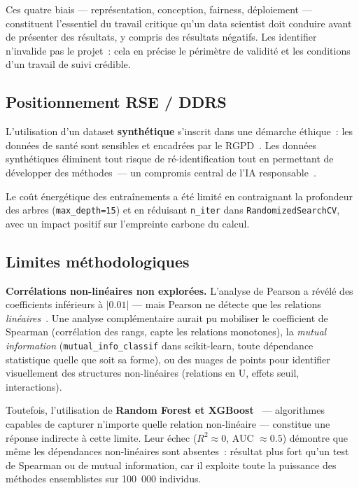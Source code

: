 Ces quatre biais --- représentation, conception, fairness, déploiement --- constituent l'essentiel du travail critique qu'un data scientist doit conduire avant de présenter des résultats, y compris des résultats négatifs. Les identifier n'invalide pas le projet~: cela en précise le périmètre de validité et les conditions d'un travail de suivi crédible.

\subsection{Positionnement RSE / DDRS}

L'utilisation d'un dataset \textbf{synthétique} s'inscrit dans une démarche éthique~: les données de santé sont sensibles et encadrées par le RGPD~\cite{rgpd2016}. Les données synthétiques éliminent tout risque de ré-identification tout en permettant de développer des méthodes~--- un compromis central de l'IA responsable~\cite{rgpd2016}.

Le coût énergétique des entraînements a été limité en contraignant la profondeur des arbres (\texttt{max\_depth=15}) et en réduisant \texttt{n\_iter} dans \texttt{RandomizedSearchCV}, avec un impact positif sur l'empreinte carbone du calcul.

\subsection{Limites méthodologiques}

\textbf{Corrélations non-linéaires non explorées.} L'analyse de Pearson a révélé des coefficients inférieurs à $|0.01|$ --- mais Pearson ne détecte que les relations \textit{linéaires}~\cite{james2021}. Une analyse complémentaire aurait pu mobiliser le coefficient de Spearman (corrélation des rangs, capte les relations monotones), la \textit{mutual information} (\texttt{mutual\_info\_classif} dans scikit-learn, toute dépendance statistique quelle que soit sa forme), ou des nuages de points pour identifier visuellement des structures non-linéaires (relations en U, effets seuil, interactions).

Toutefois, l'utilisation de \textbf{Random Forest et XGBoost}~\cite{breiman2001} --- algorithmes capables de capturer n'importe quelle relation non-linéaire --- constitue une réponse indirecte à cette limite. Leur échec ($R^2 \approx 0$, AUC $\approx 0.5$) démontre que même les dépendances non-linéaires sont absentes~: résultat plus fort qu'un test de Spearman ou de mutual information, car il exploite toute la puissance des méthodes ensemblistes sur 100~000 individus.

